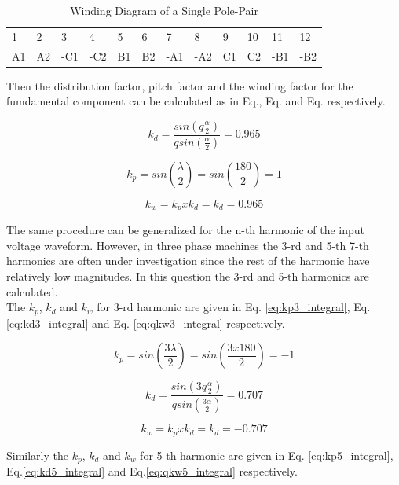 \documentclass{article}
\begin{document}
\begin{table}[H]
	\caption{Winding Diagram of a Single Pole-Pair}
	\label{tab:winding_integral}
	\begin{tabular}{llllllllllll}
	1	& 2 &3  &4  & 5 & 6 & 7 & 8 & 9 &10  &11  &12  \\
	A1	& A2 & -C1 & -C2 & B1 &B2  & -A1 & -A2 &C1  & C2 & -B1 & -B2
	\end{tabular}
\end{table}
Then the distribution factor, pitch factor and the winding factor for the fumdamental component can be calculated as in Eq., Eq. and Eq. respectively.

\begin{equation}
k_d=\frac{sin(q\frac{\alpha}{2})}{qsin(\frac{\alpha}{2})}=0.965
\label{eq:kp_integral}
\end{equation}

\begin{equation}
k_p=sin(\frac{\lambda}{2})=sin(\frac{180}{2})=1
\label{eq:kd_integral}
\end{equation}

\begin{equation}
k_w=k_pxk_d=k_d=0.965
\label{eq:qkw_integral}
\end{equation}

The same procedure can be generalized for the n-th harmonic of the input voltage waveform. However, in three phase machines the 3-rd and 5-th 7-th harmonics are often under investigation since the rest of the harmonic have relatively low magnitudes. In this question the 3-rd and 5-th harmonics are calculated.\\
The $k_p$, $k_d$ and $k_w$ for 3-rd harmonic are given in Eq. \ref{eq:kp3_integral}, Eq.\ref{eq:kd3_integral} and Eq. \ref{eq:qkw3_integral} respectively.

\begin{equation}
k_p=sin(\frac{3\lambda}{2})=sin(\frac{3x180}{2})=-1
\label{eq:kd3_integral}
\end{equation}


\begin{equation}
k_d=\frac{sin(3q\frac{\alpha}{2})}{qsin(\frac{3\alpha}{2})}=0.707
\label{eq:kp3_integral}
\end{equation}

\begin{equation}
k_w=k_pxk_d=k_d=-0.707
\label{eq:qkw3_integral}
\end{equation}

Similarly the $k_p$, $k_d$ and $k_w$ for 5-th harmonic are given in Eq. \ref{eq:kp5_integral}, Eq.\ref{eq:kd5_integral}  and Eq.\ref{eq:qkw5_integral} respectively.
\end{document}
